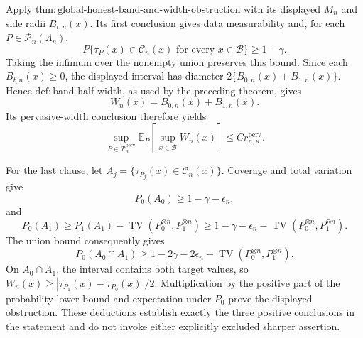 Apply \(\mathrm{thm:global\text{-}honest\text{-}band\text{-}and\text{-}width\text{-}obstruction}\) with its displayed \(M_n\) and side radii \(B_{t,n}(x)\). Its first conclusion gives data measurability and, for each \(P\in\mathcal P_n(\Lambda_n)\),
\[
 P\{\tau_P(x)\in\mathcal C_n(x)\text{ for every }x\in\mathcal B\}\ge1-\gamma.
\]
Taking the infimum over the nonempty union preserves this bound. Since each \(B_{t,n}(x)\ge0\), the displayed interval has diameter \(2\{B_{0,n}(x)+B_{1,n}(x)\}\). Hence \(\mathrm{def:band\text{-}half\text{-}width}\), as used by the preceding theorem, gives
\[
 W_n(x)=B_{0,n}(x)+B_{1,n}(x).
\]
Its pervasive-width conclusion therefore yields
\[
 \sup_{P\in\mathcal P_{\kappa}^{\mathrm{perv}}}
 \mathbb E_P\left[\sup_{x\in\mathcal B}W_n(x)\right]
 \le C r_{n,\kappa}^{\mathrm{perv}}.
\]

For the last clause, let \(A_j=\{\tau_{P_j}(x)\in\mathcal C_n(x)\}\). Coverage and total variation give
\[
 P_0(A_0)\ge1-\gamma-\epsilon_n,
\]
and
\[
 P_0(A_1)\ge P_1(A_1)-\operatorname{TV}(P_0^{\otimes n},P_1^{\otimes n})
 \ge1-\gamma-\epsilon_n-\operatorname{TV}(P_0^{\otimes n},P_1^{\otimes n}).
\]
The union bound consequently gives
\[
 P_0(A_0\cap A_1)
 \ge1-2\gamma-2\epsilon_n-\operatorname{TV}(P_0^{\otimes n},P_1^{\otimes n}).
\]
On \(A_0\cap A_1\), the interval contains both target values, so \(W_n(x)\ge|\tau_{P_1}(x)-\tau_{P_0}(x)|/2\). Multiplication by the positive part of the probability lower bound and expectation under \(P_0\) prove the displayed obstruction. These deductions establish exactly the three positive conclusions in the statement and do not invoke either explicitly excluded sharper assertion.
